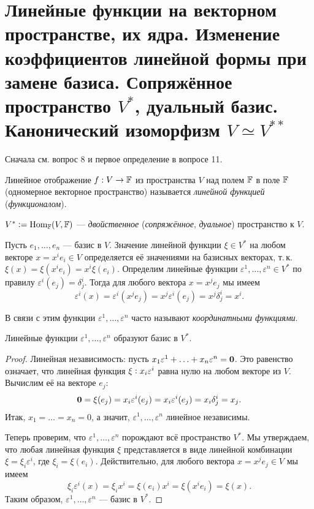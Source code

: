 \section{Линейные функции на векторном пространстве, их ядра. Изменение коэффициентов линейной формы при замене базиса. Сопряжённое пространство $V^\ast$, дуальный базис. Канонический изоморфизм $V \simeq V^{\ast\ast}$}

Сначала см. вопрос 8 и первое определение в вопросе 11.

\begin{definition}
    Линейное отображение $f: V \to \mathbb{F}$ из пространства $V$ над полем $\mathbb{F}$ в поле $\mathbb{F}$ (одномерное векторное пространство) называется \textit{линейной функцией} (\textit{функционалом}).
\end{definition}

\begin{definition}
    $V^\ast \vcentcolon = \operatorname{Hom}_{\mathbb{F}}(V, \mathbb{F})$ --- \textit{двойственное} (\textit{сопряжённое}, \textit{дуальное}) пространство к $V$.
\end{definition}

Пусть $e_1, \ldots, e_n$ --- базис в $V$. Значение линейной функции $\xi \in V^\ast$ на любом векторе $x = x^ie_i \in V$ определяется её значениями на базисных векторах, т.\,к. $\xi(x) = \xi(x^ie_i) = x^i\xi(e_i)$. Определим линейные функции $\varepsilon^1, \ldots, \varepsilon^n \in V^\ast$ по правилу $\varepsilon^i(e_j) = \delta^i_j$. Тогда для любого вектора $x = x^je_j$ мы имеем
\[
    \varepsilon^i(x) = \varepsilon^i(x^je_j) = x^j\varepsilon^i(e_j) = x^j\delta^i_j = x^i.
\]

\begin{definition}
    В связи с этим функции $\varepsilon^1, \ldots, \varepsilon^n$ часто называют \textit{координатными функциями}.
\end{definition}

\begin{proposal}
    Линейные функции $\varepsilon^1, \ldots, \varepsilon^n$ образуют базис в $V^\ast$.
\end{proposal}

\begin{proof}
    Линейная независимость: пусть $x_1\varepsilon^1 + \ldots + x_n\varepsilon^n = \boldsymbol{0}$. Это равенство означает, что линейная функция $\xi \vcentcolon x_i\varepsilon^i$ равна нулю на любом векторе из $V$. Вычислим её на векторе $e_j$:
    \[
        \boldsymbol{0} = \xi(e_j) = x_i\varepsilon^i(e_j) = x_i\varepsilon^i(e_j) = x_i\delta^i_j = x_j.
    \]
    Итак, $x_1 = \ldots = x_n = 0$, а значит, $\varepsilon^1, \ldots, \varepsilon^n$ линейное независимы.

    Теперь проверим, что $\varepsilon^1, \ldots, \varepsilon^n$ порождают всё пространство $V^\ast$. Мы утверждаем, что любая линейная функция $\xi$ представляется в виде линейной комбинации $\xi = \xi_i\varepsilon^i$, где $\xi_i = \xi(e_i)$. Действительно, для любого вектора $x = x^je_j \in V$ мы имеем
    \[
        \xi_i\varepsilon^i(x) = \xi_i x^i = \xi(e_i)x^i = \xi(x^ie_i) = \xi(x).
    \]
    Таким образом, $\varepsilon^1, \ldots, \varepsilon^n$ --- базис в $V^\ast$.
\end{proof}

